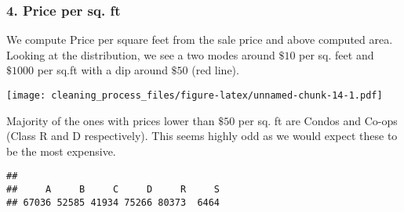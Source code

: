 \documentclass[]{article}
\newenvironment{Shaded}{\begin{snugshade}}{\end{snugshade}}
\newcommand{\DataTypeTok}[1]{\textcolor[rgb]{0.13,0.29,0.53}{#1}}
\newcommand{\DecValTok}[1]{\textcolor[rgb]{0.00,0.00,0.81}{#1}}
\newcommand{\KeywordTok}[1]{\textcolor[rgb]{0.13,0.29,0.53}{\textbf{#1}}}
\newcommand{\NormalTok}[1]{#1}
\newcommand{\OperatorTok}[1]{\textcolor[rgb]{0.81,0.36,0.00}{\textbf{#1}}}
\newcommand{\StringTok}[1]{\textcolor[rgb]{0.31,0.60,0.02}{#1}}
\begin{document}
\hypertarget{price-per-sq.-ft}{%
\subsubsection{4. Price per sq. ft}\label{price-per-sq.-ft}}

We compute Price per square feet from the sale price and above computed
area. Looking at the distribution, we see a two modes around \(\$10\)
per sq. feet and \(\$1000\) per sq.ft with a dip around \(\$50\) (red
line).

\begin{Shaded}
\end{Shaded}

\begin{Shaded}
\end{Shaded}

\texttt{[image: cleaning\_process\_files/figure-latex/unnamed-chunk-14-1.pdf]}

Majority of the ones with prices lower than \(\$50\) per sq. ft are
Condos and Co-ops (Class R and D respectively). This seems highly odd as
we would expect these to be the most expensive.

\begin{Shaded}
\end{Shaded}

\begin{verbatim}
## 
##     A     B     C     D     R     S 
## 67036 52585 41934 75266 80373  6464
\end{verbatim}
\end{document}
